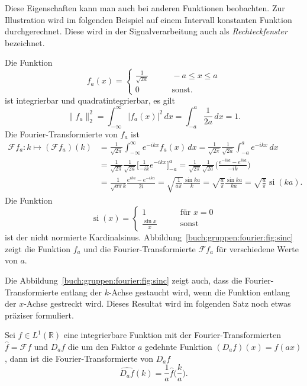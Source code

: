 Diese Eigenschaften kann man auch bei anderen Funktionen beobachten.
Zur Illustration wird im folgenden Beispiel auf einem Intervall
konstanten Funktion durchgerechnet.
Diese wird in der Signalverarbeitung auch als {\em Rechteckfenster}
bezeichnet.

\begin{beispiel}
\label{buch:gruppen:fourier:beispiel:rechteck}
Die Funktion
\[
f_a(x)
=
\begin{cases}
\frac1{\!\sqrt{2a}}&\qquad -a\le x \le a\\
0&\qquad\text{sonst}.
\end{cases}
\]
ist integrierbar und quadratintegrierbar, es gilt
\[
\|f_a\|_2^2
=
\int_{-\infty}^\infty
|f_a(x)|^2
\,dx
=
\int_{-a}^a \frac{1}{2a} \,dx
=
1.
\]
Die Fourier-Transformierte von $f_a$ ist
\begin{align*}
\mathscr{F}f_a
\colon k\mapsto
(\mathscr{F}f_a)(k)
&=
\frac{1}{\!\sqrt{2\pi}}
\int_{-\infty}^\infty e^{-ikx} f_a(x)\,dx
=
\frac{1}{\!\sqrt{2\pi}}
\frac{1}{\!\sqrt{2a}}
\int_{-a}^a e^{-ikx}\,dx
\\
&=
\frac{1}{\!\sqrt{2\pi}}
\frac{1}{\!\sqrt{2a}}
\biggl[
\frac{1}{-ik} e^{-ikx}
\biggr]_{-a}^a
=
\frac{1}{\!\sqrt{2\pi}}
\frac{1}{\!\sqrt{2a}}\biggl(
\frac{
e^{-ika}-e^{ika}
}{
-ik
}
\biggr)
\\
&=
\frac{1}{\!\sqrt{a\pi}k}\frac{e^{ika}-e^{-ika}}{2i}
=
\!\sqrt{\frac{1}{a\pi}} \frac{\sin ka}{k}
=
\!\sqrt{\frac{a}{\pi}} \frac{\sin ka}{ka}
=
\!\sqrt{\frac{a}{\pi}}
\operatorname{si}(ka).
\end{align*}
Die Funktion
\[
\operatorname{si}(x)
=
\begin{cases}
1&\qquad \text{für $x = 0$}\\
\displaystyle\frac{\sin x}{x}&\qquad\text{sonst}
\end{cases}
\]
ist der nicht normierte Kardinalsinus.
Abbildung~\ref{buch:gruppen:fourier:fig:sinc} zeigt die Funktion 
$f_a$ und die Fourier-Trans\-for\-mier\-te $\mathscr{F}f_a$ für verschiedene
Werte von $a$.
\end{beispiel}



Die Abbildung~\ref{buch:gruppen:fourier:fig:sinc} zeigt auch, dass
die Fourier-Transformierte entlang der $k$-Achse gestaucht wird,
wenn die Funktion entlang der $x$-Achse gestreckt wird.
Dieses Resultat wird im folgenden Satz noch etwas präziser
formuliert.

\begin{satz}
\label{buch:gruppen:fourier:satz:FDa}
Sei $f\in L^1(\mathbb{R})$ eine integrierbare Funktion mit der
Fourier-Transformierten $\hat{f}=\mathscr{F}f$ und $D_af$ die um
den Faktor $a$ gedehnte Funktion $(D_af)(x)=f(ax)$, dann ist
die Fourier-Transformierte von $D_af$
\[
\widehat{D_af}(k)
=
\frac1a \hat{f}\biggl(\frac{k}{a}\biggr).
\]
\end{satz}

